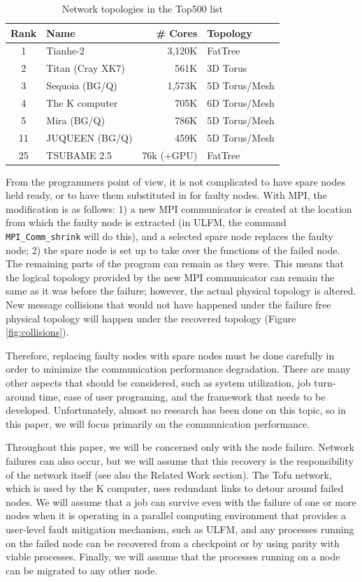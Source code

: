 \documentclass[Afour,times,sagev]{sagej}
\begin{document}
\begin{table}[htb]
\centering
\caption{Network topologies in the Top500 list\citep{top500}}
\label{tbl:top5-network}
{\small
\begin{tabular}{c|l|r|l}
\hline
Rank & Name & \# Cores & Topology \\
\hline
\hline
1 & Tianhe-2 & 3,120K & FatTree \\
2 & Titan (Cray XK7) & 561K & 3D Torus \\
3 & Sequoia (BG/Q) & 1,573K & 5D Torus/Mesh \\
4 & The K computer & 705K & 6D Torus/Mesh \\
5 & Mira (BG/Q) & 786K & 5D Torus/Mesh \\
\hline
11 & JUQUEEN (BG/Q) & 459K & 5D Torus/Mesh \\
\hline
25 & TSUBAME 2.5 & 76k (+GPU) & FatTree \\
\hline
\end{tabular}
}
\end{table}

From the programmers point of view, it is not complicated to have
spare nodes held ready, or to have them substituted in for faulty
nodes. With MPI, the modification is as follows: 1) a new MPI
communicator is created at the location from which the faulty node is
extracted (in ULFM, the command {\tt MPI\_Comm\_shrink} will do this),
and a selected spare node replaces the faulty node; 2) the spare node
is set up to take over the functions of the failed node. The remaining
parts of the program can remain as they were. This means that the
logical topology provided by the new MPI communicator can remain the
same as it was before the failure; however, the actual physical
topology is altered. New message collisions that would not
have happened under the failure free physical topology will happen
under the recovered topology (Figure \ref{fig:collisions}).

Therefore, replacing faulty nodes with spare nodes must be done
carefully in order to minimize the communication performance
degradation. There are many other aspects that should be considered,
such as system utilization, job turn-around time, ease of user
programing, and the framework that needs to be
developed. Unfortunately, almost no research has been done on this
topic, so in this paper, we will focus primarily on the communication
performance.

Throughout this paper, we will be concerned only with the node
failure. Network failures can also occur, but we will assume that this
recovery is the responsibility of the network
itself\citep{Domke:2014:FND:2683593.2683659} (see also the Related
Work section). The Tofu network, which is used by the K
computer, uses redundant links to detour around failed
nodes\citep{sumimoto-k}. We will assume that a job can survive even
with the failure of one or more nodes when it is operating in a
parallel computing environment that provides a user-level fault
mitigation mechanism, such as ULFM, and any processes running on the
failed node can be recovered from a checkpoint or by using parity with
viable processes. Finally, we will assume that the processes running
on a node can be migrated to any other node.
\end{document}

